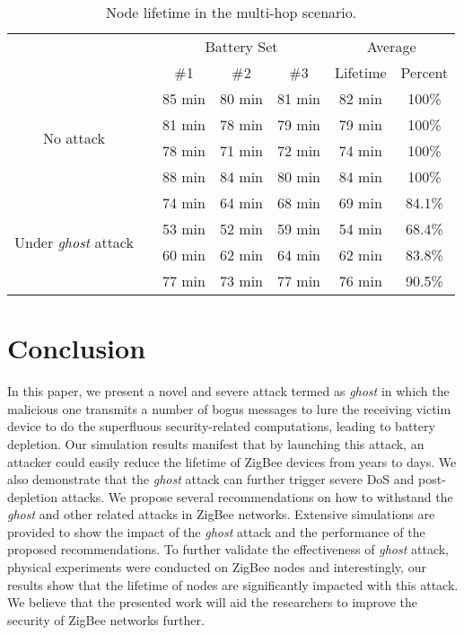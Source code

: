 \documentclass[10pt,journal,cspaper,compsoc]{IEEEtran}
\begin{document}
\begin{table}[ht]
\scriptsize
\caption{Node lifetime in the multi-hop scenario.}
\vspace{-3mm}
\center
\begin{tabular}{c|cccccc}
\toprule
\multicolumn{2}{c}{\multirow{2}{*}{}} & \multicolumn{3}{c}{Battery Set} & \multicolumn{2}{c}{{Average}} \\ \cline{3-7}
  \multicolumn{2}{c}{} & \#1& \#2& \#3& {Lifetime} & {Percent} \\ \hline
  \multirow{4}{*}{\parbox{0.76cm}{No attack}} &  & 85 min & 80 min & 81 min & 82 min & 100\%\\ &  & 81 min & 78 min & 79 min & 79 min & 100\% \\ &  & 78 min & 71 min & 72 min & 74 min & 100\% \\ &  & 88 min & 84 min & 80 min & 84 min & 100\% \\ \hline
  \multirow{4}{*}{\parbox{0.76cm}{Under {\em ghost} attack}} &  & 74 min & 64 min & 68 min & 69 min & 84.1\%\\ &  & 53 min & 52 min & 59 min & 54 min & 68.4\% \\ &  & 60 min & 62 min & 64 min & 62 min & 83.8\%\\ &  & 77 min & 73 min & 77 min & 76 min & 90.5\% \\ \bottomrule
\end{tabular}\label{experimentdatamultihop}
\end{table}



\section{Conclusion}\label{conclude}
In this paper, we present a novel and severe attack termed as {\em ghost} in which the malicious one transmits a number of bogus messages to lure the receiving victim device to do the superfluous security-related computations, leading to battery depletion. Our simulation results manifest that by launching this attack, an attacker could easily reduce the lifetime of ZigBee devices from years to days. We also demonstrate that the {\em ghost} attack can further trigger severe DoS and post-depletion attacks. We propose several recommendations on how to withstand the {\em ghost}  and other related attacks in ZigBee networks. Extensive simulations are provided to show the impact of the {\em ghost} attack and the performance of the proposed recommendations. To further validate the effectiveness of {\em ghost} attack, physical experiments were conducted on ZigBee nodes and interestingly, our results show that the lifetime of nodes are significantly impacted with this attack. We believe that the presented work will aid the researchers to improve the security of ZigBee networks further.





\end{document}
